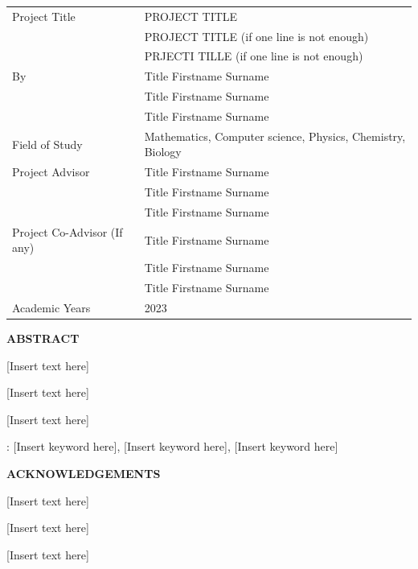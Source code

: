 \documentclass[12pt,a4paper,oneside]{book}
\theoremstyle{plain}
\numberwithin{equation}{chapter} \DeclareMathOperator{\Var}{Var}
\begin{document}
\newpage
{}
\begin{table}[h]
	\begin{tabular}{ll}
		Project Title								   & PROJECT TITLE  \\
										 					&PROJECT TITLE (if one line is not enough) \\
										 					& PRJECTI TILLE (if one line is not enough) \\
		By							   					  & Title Firstname Surname \\
															& Title Firstname Surname \\
															& Title Firstname Surname \\
		Field of Study			  					 & Mathematics, Computer science, Physics, Chemistry,
Biology
\\
		Project Advisor								& Title Firstname Surname \\
															& Title Firstname Surname \\
															& Title Firstname Surname \\
		Project Co-Advisor (If any)			  & Title Firstname Surname \\
															& Title Firstname Surname \\
															& Title Firstname Surname \\
		Academic Years							  & 2023 \\
	\end{tabular}
\end{table}
\begin{center}
  \large{\textbf{ABSTRACT}}\\
\end{center}

[Insert text here]

[Insert text here]

[Insert text here]

 : [Insert keyword here], [Insert keyword here], [Insert keyword here]

\newpage
\begin{center}
	\large{\textbf{ACKNOWLEDGEMENTS}} \\
\end{center}

[Insert text here]

[Insert text here]

[Insert text here]\\\\
\end{document}
